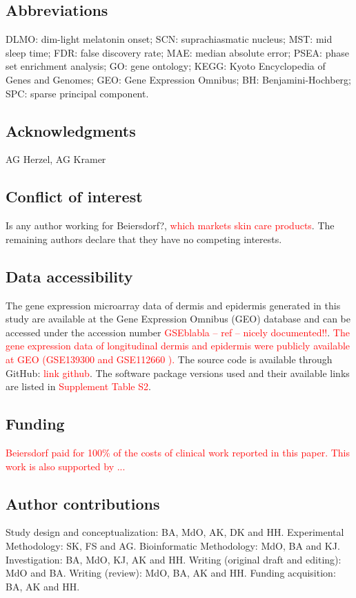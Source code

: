 \subsection*{Abbreviations}
DLMO: dim-light melatonin onset; SCN: suprachiasmatic nucleus; MST: mid sleep time; FDR: false discovery rate; MAE: median absolute error; PSEA: phase set enrichment analysis; GO: gene ontology; KEGG: Kyoto Encyclopedia of Genes and Genomes; GEO: Gene Expression Omnibus; BH: Benjamini-Hochberg; SPC: sparse principal component.

\subsection*{Acknowledgments}
AG Herzel, AG Kramer

\subsection*{Conflict of interest}
Is any author working for Beiersdorf?, \textcolor{red}{which markets skin care products}. The remaining authors declare that they have no competing interests.


\subsection*{Data accessibility}
The gene expression microarray data of dermis and epidermis generated in this study are available at the Gene Expression Omnibus (GEO) database and can be accessed under the accession number \textcolor{red}{GSEblabla -- ref -- nicely documented!!}. \textcolor{red}{The gene expression data of longitudinal dermis and epidermis were publicly available at GEO (GSE139300 \cite{GSE139300} and GSE112660 \cite{GSE112660}). }The source code is available through GitHub: \textcolor{red}{link github}. The software package versions used and their available links are listed in \textcolor{red}{Supplement Table S2}.

\subsection*{Funding}
\textcolor{red}{Beiersdorf paid for 100\% of the costs of clinical work reported in this paper. This work is also supported by ...}

\subsection*{Author contributions}
Study design and conceptualization: BA, MdO, AK, DK and HH. Experimental Methodology: SK, FS and AG. Bioinformatic Methodology: MdO, BA and KJ. Investigation: BA, MdO, KJ, AK and HH. Writing (original draft and editing): MdO and BA. Writing (review): MdO, BA, AK and HH. Funding acquisition: BA, AK and HH.

